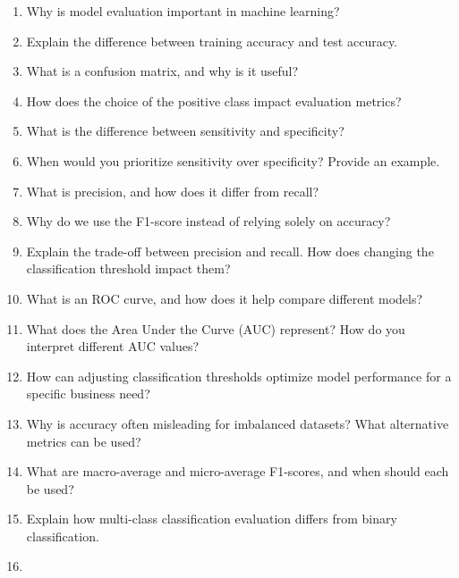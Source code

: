 \documentclass[
  11pt,
]{book}
\providecommand{\tightlist}{%
  \setlength{\itemsep}{0pt}\setlength{\parskip}{0pt}}
\theoremstyle{definition}
\theoremstyle{definition}
\theoremstyle{definition}
\theoremstyle{definition}
\theoremstyle{remark}
\begin{document}
\begin{enumerate}
\def\labelenumi{\arabic{enumi}.}
\tightlist
\item
  Why is model evaluation important in machine learning?\\
\item
  Explain the difference between training accuracy and test accuracy.\\
\item
  What is a confusion matrix, and why is it useful?\\
\item
  How does the choice of the positive class impact evaluation metrics?\\
\item
  What is the difference between sensitivity and specificity?\\
\item
  When would you prioritize sensitivity over specificity? Provide an example.\\
\item
  What is precision, and how does it differ from recall?\\
\item
  Why do we use the F1-score instead of relying solely on accuracy?\\
\item
  Explain the trade-off between precision and recall. How does changing the classification threshold impact them?\\
\item
  What is an ROC curve, and how does it help compare different models?\\
\item
  What does the Area Under the Curve (AUC) represent? How do you interpret different AUC values?\\
\item
  How can adjusting classification thresholds optimize model performance for a specific business need?\\
\item
  Why is accuracy often misleading for imbalanced datasets? What alternative metrics can be used?\\
\item
  What are macro-average and micro-average F1-scores, and when should each be used?\\
\item
  Explain how multi-class classification evaluation differs from binary classification.\\
\item

\end{enumerate}
\end{document}
